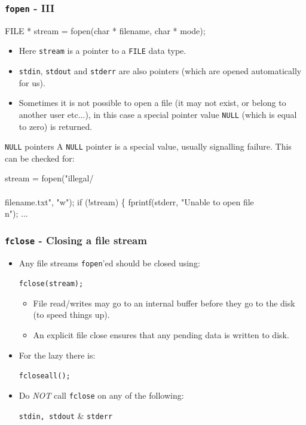 \documentclass[table]{beamer}
\newif\ifschigh\schighfalse
\newcommand{\kw}[1]{\ifschigh\textcolor{red}{#1}\else\textcolor{keyword}{#1}\fi}
\newcommand{\kt}[1]{\ifschigh\textcolor{red}{#1}\else\textcolor{ctext}{#1}\fi}
\begin{document}
\begin{frame}[fragile]
\frametitle{{\tt fopen} - III}
\begin{semiverbatim}
\small
FILE * stream = fopen(\kw{char} * filename, \kw{char} * mode);
\end{semiverbatim}
\vspace{-0.1in}
\begin{itemize}
\item Here {\tt stream} is a pointer to a {\tt FILE} data type.
\item {\tt stdin}, {\tt stdout} and {\tt stderr} are also pointers (which are opened automatically for us).
\item Sometimes it is not possible to open a file (it may not exist, or belong to another user etc...), in this case a special pointer value {\tt NULL} (which is equal to zero) is returned.
\end{itemize}

\begin{block}{{\tt NULL} pointers}
A {\tt NULL} pointer is a special value, usually signalling failure. This can be checked for:
\vspace{-0.2in}
\begin{semiverbatim}
\footnotesize
stream = fopen(\kt{"illegal/\\\\filename.txt"}, \kt{"w"});
if (!stream)
\{
   fprintf(stderr, \kt{"Unable to open file\\n"});
   ...
\end{semiverbatim}
\end{block}
\end{frame}

\begin{frame}
\frametitle{{\tt fclose} - Closing a file stream}
\begin{itemize}
\item Any file streams {\tt fopen}'ed should be closed using:
\begin{center}
\tt fclose(stream);
\end{center}
\begin{itemize}
\item File read/writes may go to an internal buffer before they go to the disk (to speed things up).
\item An explicit file close ensures that any pending data is written to disk.
\end{itemize}
\item For the lazy there is:
\begin{center}
\tt fcloseall();
\end{center}
\item Do \emph{NOT} call {\tt fclose} on any of the following:
\begin{center}
{\tt stdin, stdout} \& \tt stderr
\end{center}
\end{itemize}
\end{frame}
\end{document}
